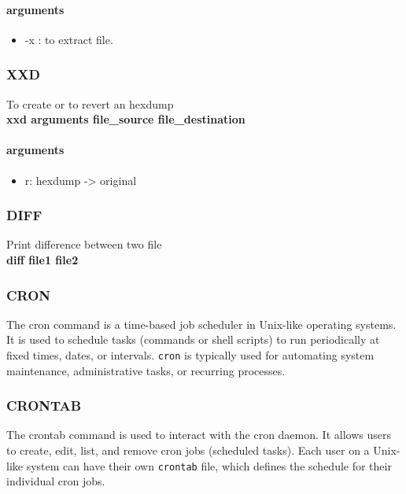 \documentclass{article}
\begin{document}
                    \paragraph{arguments}
                    \begin{itemize}
                        \item -x : to extract file.
                    \end{itemize}
                \subsubsection{XXD}
                    To create or to revert an hexdump\\
                    \textbf{xxd arguments file\_source file\_destination}
                    \paragraph{arguments}
                    \begin{itemize}
                        \item r: hexdump -> original
                    \end{itemize}
                \subsubsection{DIFF}
                    Print difference between two file\\
                    \textbf{diff file1 file2}
                \subsubsection{CRON}
                        The cron command is a time-based job scheduler in Unix-like operating systems. It is used to schedule tasks (commands or shell scripts) to run periodically at fixed times, dates, or intervals. \texttt{cron} is typically used for automating system maintenance, administrative tasks, or recurring processes.
                \subsubsection{CRONTAB}
                The crontab command is used to interact with the cron daemon. It allows users to create, edit, list, and remove cron jobs (scheduled tasks). Each user on a Unix-like system can have their own \texttt{crontab} file, which defines the schedule for their individual cron jobs.
\end{document}
